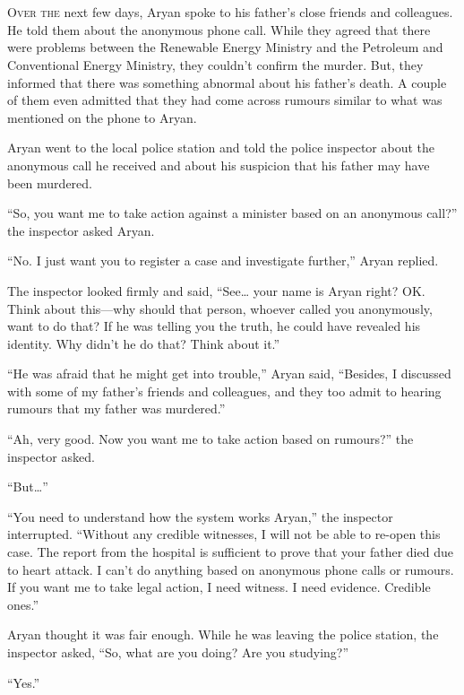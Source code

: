 \chapter{}

\lettrine{O}{ver the} next few days, Aryan spoke to his father's close friends and
colleagues. He told them about the anonymous phone call. While they agreed that
there were problems between the Renewable Energy Ministry and the
Petroleum and Conventional Energy Ministry, they couldn't confirm the murder. But,
they informed that there was something abnormal about his father's death. A
couple of them even admitted that they had come across rumours similar to what
was mentioned on the phone to Aryan.

Aryan went to the local police station and told the police inspector about the
anonymous call he received and about his suspicion that his father may have been
murdered.

“So, you want me to take action against a minister based on an anonymous call?”
the inspector asked Aryan.

“No. I just want you to register a case and investigate further,” Aryan replied.

The inspector looked firmly and said, “See… your name is Aryan right? OK.
Think about this—why should that person, whoever called you anonymously, want
to do that? If he was telling you the truth, he could have revealed his
identity. Why didn't he do that? Think about it.”

“He was afraid that he might get into trouble,” Aryan said, “Besides, I
discussed with some of my father's friends and colleagues, and they too admit to
hearing rumours that my father was murdered.”

“Ah, very good. Now you want me to take action based on rumours?” the inspector
asked.

“But…”

“You need to understand how the system works Aryan,” the inspector interrupted.
“Without any credible witnesses, I will not be able to re-open this case. The
report from the hospital is sufficient to prove that your father died due to
heart attack. I can't do anything based on anonymous phone calls or rumours. If
you want me to take legal action, I need witness. I need evidence. Credible
ones.”

Aryan thought it was fair enough. While he was leaving the police station, the
inspector asked, “So, what are you doing? Are you studying?”

“Yes.”


